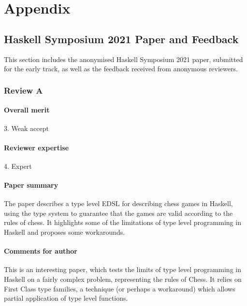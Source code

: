 \chapter{Appendix}

\section{Haskell Symposium 2021 Paper and Feedback} \label{symposiumfeedback}

This section includes the anonymised Haskell Symposium 2021 paper, submitted for the early track, as well as the feedback received from anonymous reviewers.

\subsection{Review A}

\subsubsection{Overall merit}

3. Weak accept

\subsubsection{Reviewer expertise}

4. Expert

\subsubsection{Paper summary}

The paper describes a type level EDSL for describing chess games in Haskell, using the type system to guarantee that the games are valid according to the rules of chess. It highlights some of the limitations of type level programming in Haskell and proposes some workarounds.

\subsubsection{Comments for author}

This is an interesting paper, which tests the limits of type level programming in Haskell on a fairly complex problem, representing the rules of Chess. It relies on First Class type families, a technique (or perhaps a workaround) which allows partial application of type level functions.

